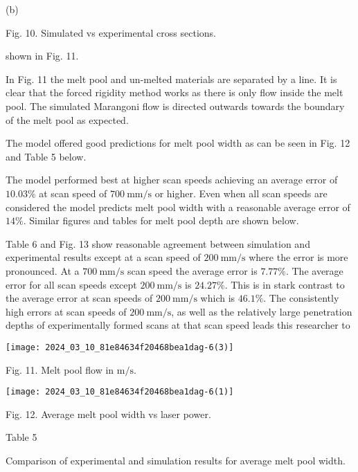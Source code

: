 \documentclass[10pt]{article}
\begin{document}
(b)

Fig. 10. Simulated vs experimental cross sections.

shown in Fig. 11.

In Fig. 11 the melt pool and un-melted materials are separated by a line. It is clear that the forced rigidity method works as there is only flow inside the melt pool. The simulated Marangoni flow is directed outwards towards the boundary of the melt pool as expected.

The model offered good predictions for melt pool width as can be seen in Fig. 12 and Table 5 below.

The model performed best at higher scan speeds achieving an average error of $10.03 \%$ at scan speed of $700 \mathrm{~mm} / \mathrm{s}$ or higher. Even when all scan speeds are considered the model predicts melt pool width with a reasonable average error of $14 \%$. Similar figures and tables for melt pool depth are shown below.

Table 6 and Fig. 13 show reasonable agreement between simulation and experimental results except at a scan speed of $200 \mathrm{~mm} / \mathrm{s}$ where the error is more pronounced. At a $700 \mathrm{~mm} / \mathrm{s}$ scan speed the average error is $7.77 \%$. The average error for all scan speeds except $200 \mathrm{~mm} / \mathrm{s}$ is $24.27 \%$. This is in stark contrast to the average error at scan speeds of $200 \mathrm{~mm} / \mathrm{s}$ which is $46.1 \%$. The consistently high errors at scan speeds of $200 \mathrm{~mm} / \mathrm{s}$, as well as the relatively large penetration depths of experimentally formed scans at that scan speed leads this researcher to

\begin{center}
\texttt{[image: 2024\_03\_10\_81e84634f20468bea1dag-6(3)]}
\end{center}

Fig. 11. Melt pool flow in $\mathrm{m} / \mathrm{s}$.

\begin{center}
\texttt{[image: 2024\_03\_10\_81e84634f20468bea1dag-6(1)]}
\end{center}

Fig. 12. Average melt pool width vs laser power.

Table 5

Comparison of experimental and simulation results for average melt pool width.
\end{document}
